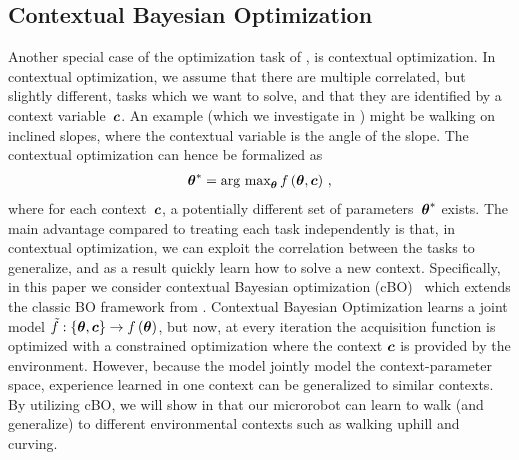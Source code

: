 \subsection{Contextual Bayesian Optimization}
	Another special case of the optimization task of , is contextual optimization.
	In contextual optimization, we assume that there are multiple correlated, but slightly different, tasks which we want to solve, and that they are identified by a context variable~$\boldsymbol{c}$.
	An example (which we investigate in ) might be walking on inclined slopes, where the contextual variable is the angle of the slope.
	The contextual optimization can hence be formalized as 
	\begin{align}
		\boldsymbol{\theta}^* = \text{arg max}_{\boldsymbol{\theta}}\, f\left(\boldsymbol{\theta},\boldsymbol{c}\right)\,,
	\end{align}
	where for each context~$\boldsymbol{c}$, a potentially different set of parameters~$\boldsymbol{\theta}^*$ exists.
	The main advantage compared to treating each task independently is that, in contextual optimization, we can exploit the correlation between the tasks to generalize, and as a result quickly learn how to solve a new context.
	Specifically, in this paper we consider contextual Bayesian optimization (cBO)~\citep{Metzen2015} which extends the classic BO framework from .
	Contextual Bayesian Optimization learns a joint model $\tilde{f}: \{\boldsymbol{\theta},\boldsymbol{c}\} \rightarrow f\left(\boldsymbol{\theta}\right)$, but now, at every iteration the acquisition function is optimized with a constrained optimization where the context $\boldsymbol{c}$ is provided by the environment. 
	However, because the model jointly model the context-parameter space, experience learned in one context can be generalized to similar contexts. 
	By utilizing cBO, we will show in  that our microrobot can learn to walk (and generalize) to different environmental contexts such as walking uphill and curving.

